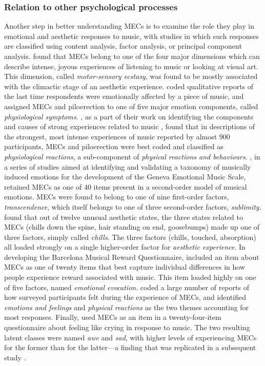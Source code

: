 \subsubsection{Relation to other psychological processes}

Another step in better understanding MECs is to examine the role they play in emotional and aesthetic responses to music, with studies in which such responses are classified using content analysis, factor analysis, or principal component analysis. \textcite{panzarella1980} found that MECs belong to one of the four major dimensions which can describe intense, joyous experiences of listening to music or looking at visual art. This dimension, called \emph{motor-sensory ecstasy}, was found to be mostly associated with the climactic stage of an aesthetic experience. \textcite{scherer2001} coded qualitative reports of the last time respondents were emotionally affected by a piece of music, and assigned MECs and piloerection to one of five major emotion components, called \emph{physiological symptoms}. \textcite{gabrielsson2003}, as a part of their work on identifying the components and causes of strong experiences related to music \parencite{gabrielsson2001a}, found that in descriptions of the strongest, most intense experiences of music reported by almost 900 participants, MECs and piloerection were best coded and classified as \emph{physiological reactions}, a sub-component of \emph{physical reactions and behaviours}. \textcite{zentner2008}, in a series of studies aimed at identifying and validating a taxonomy of musically induced emotions for the development of the Geneva Emotional Music Scale, retained MECs as one of 40 items present in a second-order model of musical emotions. MECs were found to belong to one of nine first-order factors, \emph{transcendence}, which itself belongs to one of three second-order factors, \emph{sublimity}. \textcite{silvia2011} found that out of twelve unusual aesthetic states, the three states related to MECs (chills down the spine, hair standing on end, goosebumps) made up one of three factors, simply called \emph{chills}. The three factors (chills, touched, absorption) all loaded strongly on a single higher-order factor for \emph{aesthetic experience}. In developing the Barcelona Musical Reward Questionnaire, \textcite{masherrero2013} included an item about MECs as one of twenty items that best capture individual differences in how people experience reward associated with music. This item loaded highly on one of five factors, named \emph{emotional evocation}. \textcite{bannister2020a} coded a large number of reports of how surveyed participants felt during the experience of MECs, and identified \emph{emotions and feelings} and \emph{physical reactions} as the two themes accounting for most responses. Finally, \textcite{cotter2018} used MECs as an item in a twenty-four-item questionnaire about feeling like crying in response to music. The two resulting latent classes were named \emph{awe} and \emph{sad}, with higher levels of experiencing MECs for the former than for the latter---a finding that was replicated in a subsequent study \parencite{cotter2019}.

